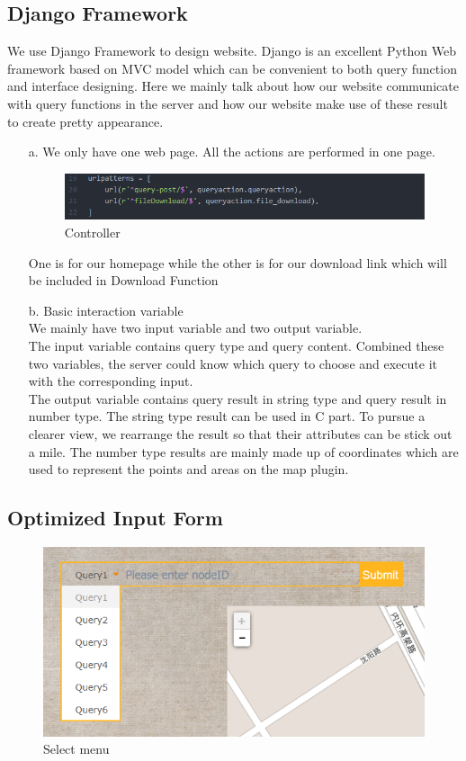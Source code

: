 \documentclass[final,1p,times]{elsarticle}
\begin{document}
\subsection{Django Framework}
We use Django Framework to design website. Django is an excellent Python Web framework based on MVC model which can be convenient to both query function and interface designing. Here we mainly talk about how our website communicate with query functions in the server and how our website make use of these result to create pretty appearance.
\begin{enumerate}
  \item[a.] We only have one web page. All the actions are performed in one page.

\begin{figure}[thpb]
      \centering
      \includegraphics[width=14cm]{code1.png}
      \caption{Controller}
      \label{fig:Vincenty}
\end{figure}

  One is for our homepage while the other is for our download link which will be included in Download Function
  \item[b.] Basic interaction variable\\
      We mainly have two input variable and two output variable.\\
      The input variable contains query type and query content. Combined these two variables, the server could know which query to choose and execute it with the corresponding input.\\
      The output variable contains query result in string type and query result in number type. The string type result can be used in C part. To pursue a clearer view, we rearrange the result so that their attributes can be stick out a mile. The number type results are mainly made up of coordinates which are used to represent the points and areas on the map plugin.
\end{enumerate}
\newpage
\subsection{Optimized Input Form}
\begin{figure}[thpb]
      \centering
      \includegraphics[width=14cm]{Q2.png}
      \caption{Select menu}
      \label{fig:q2}
\end{figure}
\end{document}
